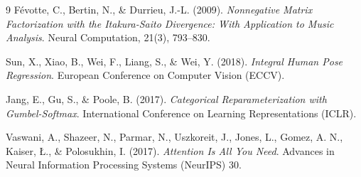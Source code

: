 \documentclass[11pt,a4paper]{article}
\begin{document}
\begin{thebibliography}{9}
F\'{e}votte, C., Bertin, N., \& Durrieu, J.-L. (2009).
\textit{Nonnegative Matrix Factorization with the Itakura-Saito Divergence: With Application to Music Analysis}.
Neural Computation, 21(3), 793--830.

Sun, X., Xiao, B., Wei, F., Liang, S., \& Wei, Y. (2018).
\textit{Integral Human Pose Regression}.
European Conference on Computer Vision (ECCV).

Jang, E., Gu, S., \& Poole, B. (2017).
\textit{Categorical Reparameterization with Gumbel-Softmax}.
International Conference on Learning Representations (ICLR).

Vaswani, A., Shazeer, N., Parmar, N., Uszkoreit, J., Jones, L., Gomez, A. N.,
Kaiser, {\L}., \& Polosukhin, I. (2017).
\textit{Attention Is All You Need}.
Advances in Neural Information Processing Systems (NeurIPS) 30.

\end{thebibliography}
\end{document}

